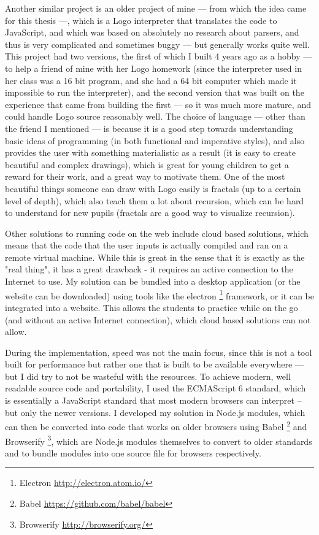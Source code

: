 Another similar project is an older project of mine --- from which the idea came for this thesis ---, which is a Logo interpreter that translates the code to JavaScript, and which was based on absolutely no research about parsers, and thus is very complicated and sometimes buggy --- but generally works quite well. This project had two versions, the first of which I built 4 years ago as a hobby --- to help a friend of mine with her Logo homework (since the interpreter used in her class was a 16 bit program, and she had a 64 bit computer which made it impossible to run the interpreter), and the second version that was built on the experience that came from building the first --- so it was much more mature, and could handle Logo source reasonably well. The choice of language --- other than the friend I mentioned --- is because it is a good step towards understanding basic ideas of programming (in both functional and imperative styles), and also provides the user with something materialistic as a result (it is easy to create beautiful and complex drawings), which is great for young children to get a reward for their work, and a great way to motivate them. One of the most beautiful things someone can draw with Logo easily is fractals (up to a certain level of depth), which also teach them a lot about recursion, which can be hard to understand for new pupils (fractals are a good way to visualize recursion).

Other solutions to running code on the web include cloud based solutions, which means that the code that the user inputs is actually compiled and ran on a remote virtual machine. While this is great in the sense that it is exactly as the "real thing", it has a great drawback - it requires an active connection to the Internet to use. My solution can be bundled into a desktop application (or the website can be downloaded) using tools like the electron \footnote{Electron \url{http://electron.atom.io/}} framework, or it can be integrated into a website. This allows the students to practice while on the go (and without an active Internet connection), which cloud based solutions can not allow.

During the implementation, speed was not the main focus, since this is not a tool built for performance but rather one that is built to be available everywhere --- but I did try to not be wasteful with the resources. To achieve modern, well readable source code and portability, I used the ECMAScript 6 standard, which is essentially a JavaScript standard that most modern browsers can interpret -- but only the newer versions. I developed my solution in Node.js modules, which can then be converted into code that works on older browsers using Babel \footnote{Babel \url{https://github.com/babel/babel}} and Browserify \footnote{Browserify \url{http://browserify.org/}}, which are Node.js modules themselves to convert to older standards and to bundle modules into one source file for browsers respectively.

